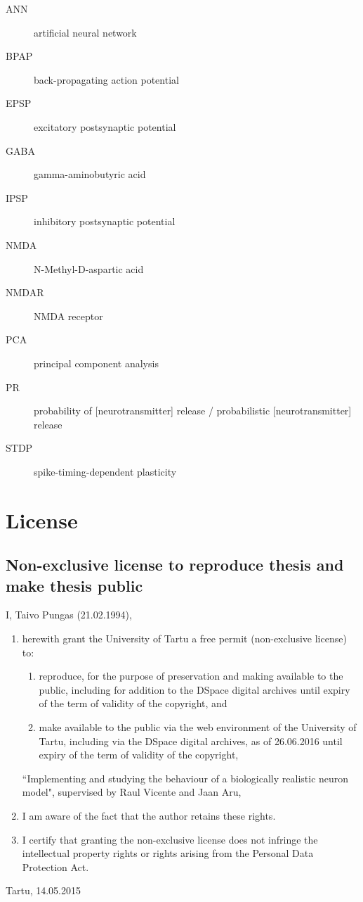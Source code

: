 \documentclass[a4paper,12pt]{report}
\theoremstyle{definition}
\newcommand{\thesistitle}{Implementing and studying the behaviour of a biologically realistic neuron model}
\begin{document}
\begin{description}
  \item[ANN] artificial neural network
  \item[BPAP] back-propagating action potential
  \item[EPSP] excitatory postsynaptic potential
  \item[GABA] gamma-aminobutyric acid
  \item[IPSP] inhibitory postsynaptic potential
  \item[NMDA] N-Methyl-D-aspartic acid
  \item[NMDAR] NMDA receptor
  \item[PCA] principal component analysis
  \item[PR] probability of [neurotransmitter] release / probabilistic [neurotransmitter] release
  \item[STDP] spike-timing-dependent plasticity
\end{description}





\chapter*{License}


%
%
\section*{Non-exclusive license to reproduce thesis and make thesis public}
I, Taivo Pungas (21.02.1994), 
\begin{enumerate}
	\item herewith grant the University of Tartu a free permit (non-exclusive license) to:
	\begin{enumerate}[label*=\arabic*.]
		\renewcommand{\theenumi}{\arabic{enumi}}
		\item reproduce, for the purpose of preservation and making available to the public, including for addition to the DSpace digital archives until expiry of the term of validity of the copyright, and
		\item make available to the public via the web environment of the University of Tartu, including via the DSpace digital archives, as of 26.06.2016 until expiry of the term of validity of the copyright,
	\end{enumerate}
	``\thesistitle", supervised by Raul Vicente and Jaan Aru,
	
	\item I am aware of the fact that the author retains these rights.

	\item I certify that granting the non-exclusive license does not infringe the intellectual property rights or rights arising from the Personal Data Protection Act. 
\end{enumerate}

Tartu, 14.05.2015

\thispagestyle{empty}
\newpage
\end{document}
